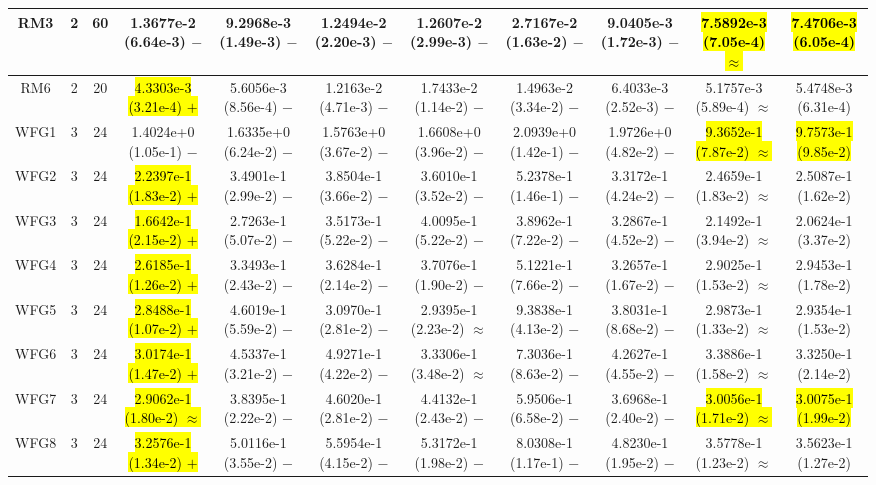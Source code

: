 \documentclass[journal]{IEEEtran}
\begin{document}
\begin{table*}[htbp]
\begin{tabular}{ccccccccccc}
\hline
\multirow{1}{*}{RM3}&2&60&1.3677e-2 (6.64e-3) $-$&9.2968e-3 (1.49e-3) $-$&1.2494e-2 (2.20e-3) $-$&1.2607e-2 (2.99e-3) $-$&2.7167e-2 (1.63e-2) $-$&9.0405e-3 (1.72e-3) $-$&\hl{7.5892e-3 (7.05e-4) $\approx$}&\hl{7.4706e-3 (6.05e-4)}\\
\hline
\multirow{1}{*}{RM6}&2&20&\hl{4.3303e-3 (3.21e-4) $+$}&5.6056e-3 (8.56e-4) $-$&1.2163e-2 (4.71e-3) $-$&1.7433e-2 (1.14e-2) $-$&1.4963e-2 (3.34e-2) $-$&6.4033e-3 (2.52e-3) $-$&5.1757e-3 (5.89e-4) $\approx$&5.4748e-3 (6.31e-4)\\
\hline
\multirow{1}{*}{WFG1}&3&24&1.4024e+0 (1.05e-1) $-$&1.6335e+0 (6.24e-2) $-$&1.5763e+0 (3.67e-2) $-$&1.6608e+0 (3.96e-2) $-$&2.0939e+0 (1.42e-1) $-$&1.9726e+0 (4.82e-2) $-$&\hl{9.3652e-1 (7.87e-2) $\approx$}&\hl{9.7573e-1 (9.85e-2)}\\
\hline
\multirow{1}{*}{WFG2}&3&24&\hl{2.2397e-1 (1.83e-2) $+$}&3.4901e-1 (2.99e-2) $-$&3.8504e-1 (3.66e-2) $-$&3.6010e-1 (3.52e-2) $-$&5.2378e-1 (1.46e-1) $-$&3.3172e-1 (4.24e-2) $-$&2.4659e-1 (1.83e-2) $\approx$&2.5087e-1 (1.62e-2)\\
\hline
\multirow{1}{*}{WFG3}&3&24&\hl{1.6642e-1 (2.15e-2) $+$}&2.7263e-1 (5.07e-2) $-$&3.5173e-1 (5.22e-2) $-$&4.0095e-1 (5.22e-2) $-$&3.8962e-1 (7.22e-2) $-$&3.2867e-1 (4.52e-2) $-$&2.1492e-1 (3.94e-2) $\approx$&2.0624e-1 (3.37e-2)\\
\hline
\multirow{1}{*}{WFG4}&3&24&\hl{2.6185e-1 (1.26e-2) $+$}&3.3493e-1 (2.43e-2) $-$&3.6284e-1 (2.14e-2) $-$&3.7076e-1 (1.90e-2) $-$&5.1221e-1 (7.66e-2) $-$&3.2657e-1 (1.67e-2) $-$&2.9025e-1 (1.53e-2) $\approx$&2.9453e-1 (1.78e-2)\\
\hline
\multirow{1}{*}{WFG5}&3&24&\hl{2.8488e-1 (1.07e-2) $+$}&4.6019e-1 (5.59e-2) $-$&3.0970e-1 (2.81e-2) $-$&2.9395e-1 (2.23e-2) $\approx$&9.3838e-1 (4.13e-2) $-$&3.8031e-1 (8.68e-2) $-$&2.9873e-1 (1.33e-2) $\approx$&2.9354e-1 (1.53e-2)\\
\hline
\multirow{1}{*}{WFG6}&3&24&\hl{3.0174e-1 (1.47e-2) $+$}&4.5337e-1 (3.21e-2) $-$&4.9271e-1 (4.22e-2) $-$&3.3306e-1 (3.48e-2) $\approx$&7.3036e-1 (8.63e-2) $-$&4.2627e-1 (4.55e-2) $-$&3.3886e-1 (1.58e-2) $\approx$&3.3250e-1 (2.14e-2)\\
\hline
\multirow{1}{*}{WFG7}&3&24&\hl{2.9062e-1 (1.80e-2) $\approx$}&3.8395e-1 (2.22e-2) $-$&4.6020e-1 (2.81e-2) $-$&4.4132e-1 (2.43e-2) $-$&5.9506e-1 (6.58e-2) $-$&3.6968e-1 (2.40e-2) $-$&\hl{3.0056e-1 (1.71e-2) $\approx$}&\hl{3.0075e-1 (1.99e-2)}\\
\hline
\multirow{1}{*}{WFG8}&3&24&\hl{3.2576e-1 (1.34e-2) $+$}&5.0116e-1 (3.55e-2) $-$&5.5954e-1 (4.15e-2) $-$&5.3172e-1 (1.98e-2) $-$&8.0308e-1 (1.17e-1) $-$&4.8230e-1 (1.95e-2) $-$&3.5778e-1 (1.23e-2) $\approx$&3.5623e-1 (1.27e-2)\\

\end{tabular}
\end{table*}
\end{document}
